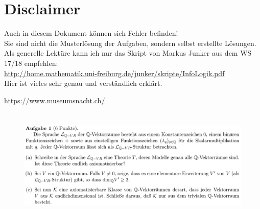 \documentclass[a4paper]{scrartcl}%
\begin{document}
\section*{Disclaimer}%
\label{sec:disclaimer}
Auch in diesem Dokument können sich Fehler befinden!\\
Sie sind nicht die Musterlösung der Aufgaben, sondern selbst erstellte Lösungen.\\

Als generelle Lektüre kann ich nur das Skript von Markus Junker aus dem WS 17/18 empfehlen:\\
\url{http://home.mathematik.uni-freiburg.de/junker/skripte/InfoLogik.pdf}\\
Hier ist vieles sehr genau und verständlich erklärt.%

\url{https://www.museumsnacht.ch/} 

\section*{}%
\label{sec:aufgabe_1}

    \begin{figure}[H]
        \includegraphics[scale=0.3]{./A-1.png}
        \label{fig:}
    \end{figure}
\end{document}
